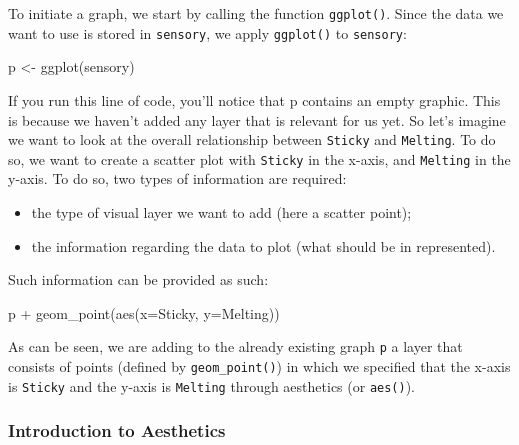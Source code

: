 \documentclass[
]{book}
\newenvironment{Shaded}{\begin{snugshade}}{\end{snugshade}}
\newcommand{\AttributeTok}[1]{\textcolor[rgb]{0.77,0.63,0.00}{#1}}
\newcommand{\FunctionTok}[1]{\textcolor[rgb]{0.00,0.00,0.00}{#1}}
\newcommand{\NormalTok}[1]{#1}
\newcommand{\OtherTok}[1]{\textcolor[rgb]{0.56,0.35,0.01}{#1}}
\newcommand{\SpecialCharTok}[1]{\textcolor[rgb]{0.00,0.00,0.00}{#1}}
\providecommand{\tightlist}{%
  \setlength{\itemsep}{0pt}\setlength{\parskip}{0pt}}
\begin{document}
To initiate a graph, we start by calling the function \texttt{ggplot()}.
Since the data we want to use is stored in \texttt{sensory}, we apply \texttt{ggplot()} to \texttt{sensory}:

\begin{Shaded}
\begin{Highlighting}[]
\NormalTok{p }\OtherTok{\textless{}{-}} \FunctionTok{ggplot}\NormalTok{(sensory)}
\end{Highlighting}
\end{Shaded}

If you run this line of code, you'll notice that p contains an empty graphic. This is because we haven't added any layer that is relevant for us yet.
So let's imagine we want to look at the overall relationship between \texttt{Sticky} and \texttt{Melting}. To do so, we want to create a scatter plot with \texttt{Sticky} in the x-axis, and \texttt{Melting} in the y-axis.
To do so, two types of information are required:

\begin{itemize}
\tightlist
\item
  the type of visual layer we want to add (here a scatter point);
\item
  the information regarding the data to plot (what should be in represented).
\end{itemize}

Such information can be provided as such:

\begin{Shaded}
\begin{Highlighting}[]
\NormalTok{p }\SpecialCharTok{+} \FunctionTok{geom\_point}\NormalTok{(}\FunctionTok{aes}\NormalTok{(}\AttributeTok{x=}\NormalTok{Sticky, }\AttributeTok{y=}\NormalTok{Melting))}
\end{Highlighting}
\end{Shaded}

As can be seen, we are adding to the already existing graph \texttt{p} a layer that consists of points (defined by \texttt{geom\_point()}) in which we specified that the x-axis is \texttt{Sticky} and the y-axis is \texttt{Melting} through aesthetics (or \texttt{aes()}).

\hypertarget{introduction-to-aesthetics}{%
\subsubsection{Introduction to Aesthetics}\label{introduction-to-aesthetics}}
\end{document}
